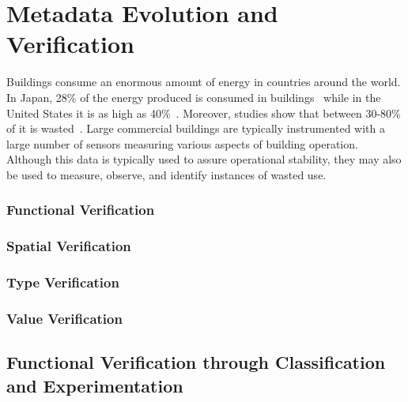 

\chapter{Metadata Evolution and Verification}

Buildings consume an enormous amount of energy in countries around the world.  In 
Japan, 28\% of the energy produced is consumed in buildings~\cite{japanbuildings} while in the United 
States it is as high as 40\%~\cite{epabuildings}.  Moreover, studies show that between 30-80\% of it
is wasted~\cite{waste_science, next10_waste}.  Large commercial buildings are typically instrumented
with a large number of sensors measuring various aspects of building operation.  Although this data is
typically used to assure operational stability, they may also be used to measure, observe, and identify
instances of wasted use.

\subsection{Functional Verification}


\subsection{Spatial Verification}

\subsection{Type Verification}
\subsection{Value Verification}



\section{Functional Verification through Classification and Experimentation}















